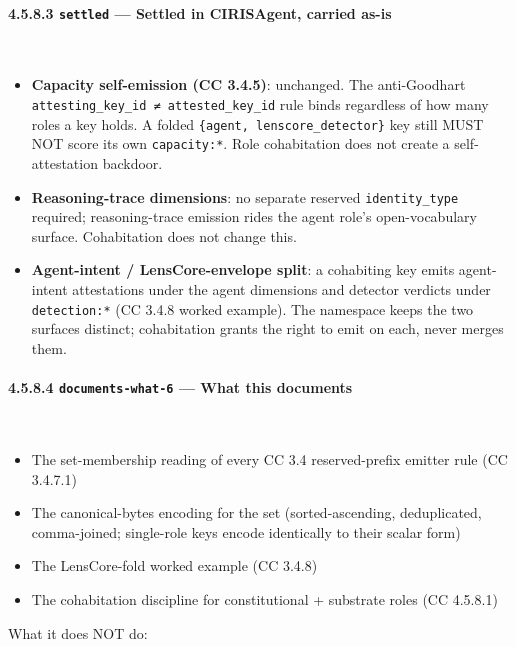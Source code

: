 \documentclass[11pt]{article}
\begin{document}
\paragraph{4.5.8.3 \texttt{settled} — Settled in CIRISAgent, carried as-is}\mbox{}\\


\begin{itemize}\setlength\itemsep{0pt}
\item \textbf{Capacity self-emission (CC 3.4.5)}: unchanged. The anti-Goodhart \texttt{attesting\_key\_id ≠ attested\_key\_id} rule binds regardless of how many roles a key holds. A folded \texttt{\{agent, lenscore\_detector\}} key still MUST NOT score its own \texttt{capacity:*}. Role cohabitation does not create a self-attestation backdoor.
\item \textbf{Reasoning-trace dimensions}: no separate reserved \texttt{identity\_type} required; reasoning-trace emission rides the agent role's open-vocabulary surface. Cohabitation does not change this.
\item \textbf{Agent-intent / LensCore-envelope split}: a cohabiting key emits agent-intent attestations under the agent dimensions and detector verdicts under \texttt{detection:*} (CC 3.4.8 worked example). The namespace keeps the two surfaces distinct; cohabitation grants the right to emit on each, never merges them.
\end{itemize}


\paragraph{4.5.8.4 \texttt{documents-what-6} — What this documents}\mbox{}\\


\begin{itemize}\setlength\itemsep{0pt}
\item The set-membership reading of every CC 3.4 reserved-prefix emitter rule (CC 3.4.7.1)
\item The canonical-bytes encoding for the set (sorted-ascending, deduplicated, comma-joined; single-role keys encode identically to their scalar form)
\item The LensCore-fold worked example (CC 3.4.8)
\item The cohabitation discipline for constitutional + substrate roles (CC 4.5.8.1)
\end{itemize}


What it does NOT do:
\end{document}
